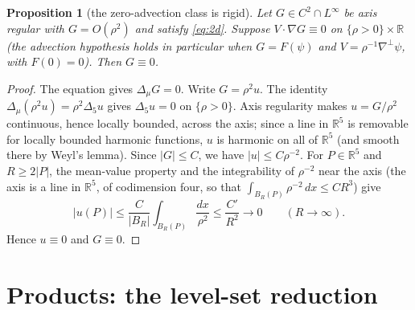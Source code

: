 \documentclass[11pt]{article}
\newtheorem{proposition}[theorem]{Proposition}
\theoremstyle{definition}
\newcommand{\R}{\mathbb{R}}
\begin{document}
\begin{proposition}[the zero-advection class is rigid]\label{prop:zeroadv}
Let $G\in C^2\cap L^\infty$ be axis regular with $G=O(\rho^2)$ and satisfy
\eqref{eq:2d}. Suppose $V\cdot\nabla G\equiv0$ on $\{\rho>0\}\times\R$ (the
advection hypothesis holds in particular when $G=F(\psi)$ and
$V=\rho^{-1}\nabla^\perp\psi$, with $F(0)=0$). Then $G\equiv0$.
\end{proposition}
\begin{proof}
The equation gives $\Delta_\mu G=0$. Write $G=\rho^2u$. The identity
$\Delta_\mu(\rho^2u)=\rho^2\Delta_5u$ gives $\Delta_5u=0$ on
$\{\rho>0\}$. Axis regularity makes $u=G/\rho^2$ continuous, hence locally
bounded, across the axis; since a line in $\R^5$ is removable for locally
bounded harmonic functions, $u$ is harmonic on all of $\R^5$ (and smooth
there by Weyl's lemma).
Since $|G|\le C$, we have $|u|\le C\rho^{-2}$. For $P\in\R^5$ and
$R\ge2|P|$, the mean-value property and the integrability of $\rho^{-2}$
near the axis (the axis is a line in $\R^5$, of codimension four, so that
$\int_{B_R(P)}\rho^{-2}\,dx\le CR^3$) give
\begin{equation}
|u(P)|\le\frac{C}{|B_R|}\int_{B_R(P)}\frac{dx}{\rho^2}
\le\frac{C'}{R^2}\longrightarrow0
\qquad(R\to\infty).
\end{equation}
Hence $u\equiv0$ and $G\equiv0$.
\end{proof}
\section{Products: the level-set reduction}\label{sec:products}
\end{document}
